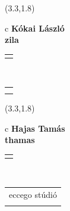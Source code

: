 \documentclass[11pt]{article}
\begin{document}
\makebox(3.3,1.8){
  \renewcommand\arraystretch{1.3}
  \begin{tabular}[c]{c}
    \hspace{8.5mm}
    \LARGE\bf{ Kókai László }\\
    \hspace{8.5mm}
    \Large{ zila }\\
    \renewcommand\arraystretch{3}
    \begin{tabular}[c]{c}
      \centering
      \fontfamily{phv}\selectfont{
        \textbf{
          \textsc{
            \scriptsize{
            \color{Bright}{ Ismerkedő }\color{Dark}{ Webmester }\color{Bright}{ Sminkmester }\color{Bright}{ Programozó }
            }
          }
        }
      }
    \end{tabular}
    \\
    \renewcommand\arraystretch{1}
    \begin{tabular}{p{3.3in}}
      \hspace{.7cm}\\
      \hspace{.7cm}\emph{  }\\
    \end{tabular}
  \end{tabular}
}

\makebox(3.3,1.8){
  \renewcommand\arraystretch{1.3}
  \begin{tabular}[c]{c}
    \hspace{8.5mm}
    \LARGE\bf{ Hajas Tamás }\\
    \hspace{8.5mm}
    \Large{ thamas }\\
    \renewcommand\arraystretch{3}
    \begin{tabular}[c]{c}
      \centering
      \fontfamily{phv}\selectfont{
        \textbf{
          \textsc{
            \scriptsize{
            \color{Bright}{ Ismerkedő }\color{Dark}{ Webmester }\color{Dark}{ Sminkmester }\color{Bright}{ Programozó }
            }
          }
        }
      }
    \end{tabular}
    \\
    \renewcommand\arraystretch{1}
    \begin{tabular}{p{3.3in}}
      \hspace{.7cm}eccego stúdió\\
      \hspace{.7cm}\emph{  }\\
    \end{tabular}
  \end{tabular}
}
\end{document}
